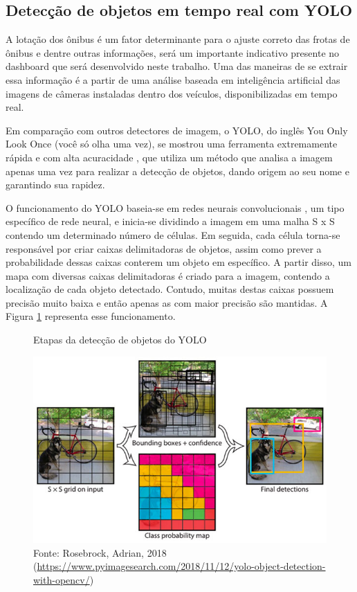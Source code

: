 \subsection{Detecção de objetos em tempo real com YOLO}

\indent
\par A lotação dos ônibus é um fator determinante para o ajuste correto das frotas de ônibus e dentre outras informações, será um importante indicativo presente no dashboard que será desenvolvido neste trabalho. Uma das maneiras de se extrair essa informação é a partir de uma análise baseada em inteligência artificial das imagens de câmeras instaladas dentro dos veículos, disponibilizadas em tempo real.

\par Em comparação com outros detectores de imagem, o YOLO, do inglês You Only Look Once (você só olha uma vez), se mostrou uma ferramenta extremamente rápida e com alta acuracidade \cite{RedmonJosephandFarhadi2018}, que utiliza um método que analisa a imagem apenas uma vez para realizar a detecção de objetos, dando origem ao seu nome e garantindo sua rapidez.

\par O funcionamento do YOLO baseia-se em redes neurais convolucionais \cite{RedmonJosephandFarhadi2018}, um tipo específico de rede neural, e inicia-se dividindo a imagem em uma malha S x S contendo um determinado número de células. Em seguida, cada célula torna-se responsável por criar caixas delimitadoras de objetos, assim como prever a probabilidade dessas caixas conterem um objeto em específico. A partir disso, um mapa com diversas caixas delimitadoras é criado para a imagem, contendo a localização de cada objeto detectado. Contudo, muitas destas caixas possuem precisão muito baixa e então apenas as com maior precisão são mantidas. A Figura \ref{funcyolo} representa esse funcionamento.

\begin{figure}[H]
    \centering
    \caption{Etapas da detecção de objetos do YOLO}
    \includegraphics[width=0.6\linewidth]{Imagens/yolo-design.jpg}
    \caption*{Fonte: Rosebrock, Adrian, 2018 (\url{https://www.pyimagesearch.com/2018/11/12/yolo-object-detection-with-opencv/})}
    \label{funcyolo}
\end{figure}

